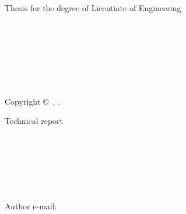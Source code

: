 \thispagestyle{empty}

\begin{center}

\sc Thesis for the degree of Licentiate of Engineering

\vspace{4cm}

\parbox{\textwidth}{\center\LARGE\bf\longtitle}

\vspace{1.5cm}

{\Large\sc\authorname}

\end{center}


\vfill

\begin{center}
{\it\division}\\
{\it\department}\\
{\sc\cth}\\
\gbg
\end{center}

\pagebreak
\thispagestyle{empty}


\textbf{\small\longtitle}\\
{\it \authorname}\\


\vspace{3mm}

Copyright \copyright\ \authorname, \year.

\vspace{5mm}


Technical report \\
\issn \\
\department \\
\researchgroup
\vspace{3mm}

\division\\
\cth\\
\post\\
\phone

\vspace{\baselineskip}

Author e-mail: {\tt \authorsmail}

\vfill


\vspace{\baselineskip}

\printservice